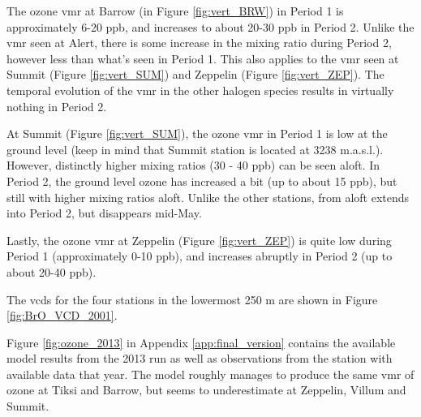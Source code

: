 \medskip

The ozone \acrshort{vmr} at Barrow (in Figure \ref{fig:vert_BRW}) in Period 1 is approximately 6-20 ppb, and increases to about 20-30 ppb in Period 2. Unlike the  \acrshort{vmr} seen at Alert, there is some increase in the mixing ratio during Period 2, however less than what's seen in Period 1. This also applies to the  \acrshort{vmr} seen at Summit (Figure \ref{fig:vert_SUM}) and Zeppelin (Figure \ref{fig:vert_ZEP}). The temporal evolution of the \acrshort{vmr} in the other halogen species results in virtually nothing in Period 2.

\medskip

At Summit (Figure \ref{fig:vert_SUM}), the ozone \acrshort{vmr} in Period 1 is low at the ground level (keep in mind that Summit station is located at 3238 m.a.s.l.). However, distinctly higher mixing ratios (30 - 40 ppb) can be seen aloft. In Period 2, the ground level ozone has increased a bit (up to about 15 ppb), but still with higher mixing ratios aloft. Unlike the other stations,  from aloft extends into Period 2, but disappears mid-May.

\medskip

Lastly, the ozone \acrshort{vmr} at Zeppelin (Figure \ref{fig:vert_ZEP}) is quite low during Period 1 (approximately 0-10 ppb), and increases abruptly in Period 2 (up to about 20-40 ppb). 









\medskip

The  \acrshort{vcd}s for the four stations in the lowermost 250 m are shown in Figure \ref{fig:BrO_VCD_2001}. 

\medskip

Figure \ref{fig:ozone_2013} in Appendix \ref{app:final_version} contains the available model results from the 2013 run as well as observations from the station with available data that year. The model roughly manages to produce the same \acrshort{vmr} of ozone at Tiksi and Barrow, but seems to underestimate at Zeppelin, Villum and Summit. 


\medskip

